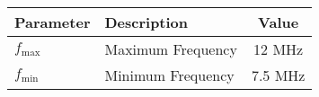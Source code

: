 \begin{tabular}{|l|l|c|}
\hline
\textbf{Parameter} & \textbf{Description} & \textbf{Value} \\
\hline
$f_{\text{max}}$ & Maximum Frequency & 12 MHz \\
\hline
$f_{\text{min}}$ & Minimum Frequency & 7.5 MHz \\
\hline
\end{tabular}

